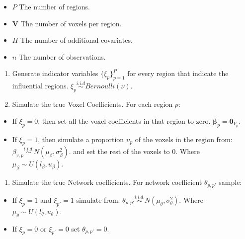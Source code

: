 \documentclass[
]{article}
\providecommand{\tightlist}{%
  \setlength{\itemsep}{0pt}\setlength{\parskip}{0pt}}
\begin{document}
\begin{itemize}
\tightlist
\item
  \(P\) The number of regions.
\item
  \( {\boldsymbol V} \) The number of voxels per region.
\item
  \(H\) The number of additional covariates.
\item
  \(n\) The number of observations.
\end{itemize}

\begin{enumerate}
\def\labelenumi{\arabic{enumi}.}
\setcounter{enumi}{1}
\tightlist
\item
  Generate indicator variables \(\{\xi_p\}_{p=1}^P\) for every region that
  indicate the influential regions.
  \(\xi_p \stackrel{i.i.d}{\sim}Bernoulli(\nu)\).
\item
  Simulate the true Voxel Coefficients. For each region \(p\):
\end{enumerate}

\begin{itemize}
\tightlist
\item
  If \(\xi_p=0\), then set all the voxel coefficients in that region to zero.
  \( {\boldsymbol \beta} _p= {\boldsymbol 0} _{V_p}\).
\item
  If \(\xi_p=1\), then simulate a proportion \(\upsilon_p\) of the voxels in the
  region from:
  \(\beta_{v,p} \stackrel{i.i.d.}{\sim}N(\mu_{\beta}, \sigma_\beta^2)\).
  and set the rest of the voxels to 0. Where
  \(\mu_\beta \sim U(l_\beta,u_\beta)\).
\end{itemize}

\begin{enumerate}
\def\labelenumi{\arabic{enumi}.}
\setcounter{enumi}{3}
\tightlist
\item
  Simulate the true Network coefficients. For network coefficient
  \(\theta_{p,p'}\) sample:
\end{enumerate}

\begin{itemize}
\tightlist
\item
  If \(\xi_p=1\) and \(\xi_{p'}=1\) simulate from:
  \(\theta_{p,p'} \stackrel{i.i.d.}{\sim}N(\mu_{\theta}, \sigma_\theta^2)\).
  Where
  \(\mu_\theta \sim U(l_\theta,u_\theta)\).
\item
  If \(\xi_p=0\) or \(\xi_{p'}=0\) set
  \(\theta_{p,p'}=0\).
\end{itemize}
\end{document}
